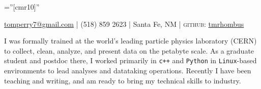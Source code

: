 \documentclass[letterpaper,12pt]{article} %
\begin{document}
\pagestyle{empty} %

\font\fb=''[cmr10]'' %


\par{\par} %
\par{\centering  \href{mailto:tomperry7@gmail.com}{tomperry7@gmail.com} | (518) 859 2623 | Santa Fe, NM | \textsc{github:} \href{https://www.github.com/tmrhombus}{tmrhombus}\par}

% 
% 

I was formally trained at the world's leading particle physics laboratory (CERN) to collect, clean, analyze, and present data on the petabyte scale. As a graduate student and postdoc there, I worked primarily in \texttt{c++} and \texttt{Python} in \texttt{Linux}-based environments to lead analyses and datataking operations. Recently I have been teaching and writing,  and am ready to bring my technical skills to industry.
\end{document}
